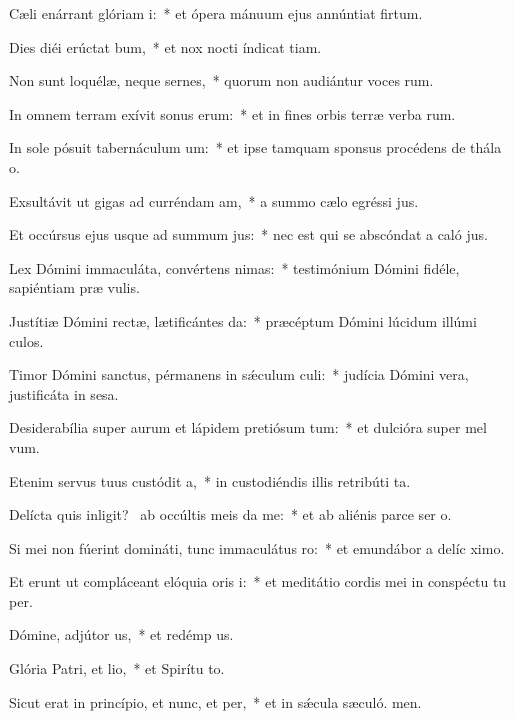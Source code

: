 \item Cæli enárrant glóriam i:~* et ópera mánuum ejus annúntiat firtum.
\item Dies diéi erúctat bum,~* et nox nocti índicat tiam.
\item Non sunt loquélæ, neque sernes,~* quorum non audiántur voces rum.
\item In omnem terram exívit sonus erum:~* et in fines orbis terræ verba rum.
\item In sole pósuit tabernáculum um:~* et ipse tamquam sponsus procédens de thála o.
\item Exsultávit ut gigas ad curréndam am,~* a summo cælo egréssi jus.
\item Et occúrsus ejus usque ad summum jus:~* nec est qui se abscóndat a caló jus.
\item Lex Dómini immaculáta, convértens nimas:~* testimónium Dómini fidéle, sapiéntiam præ vulis.
\item Justítiæ Dómini rectæ, lætificántes da:~* præcéptum Dómini lúcidum illúmi culos.
\item Timor Dómini sanctus, pérmanens in sǽculum culi:~* judícia Dómini vera, justificáta in sesa.
\item Desiderabília super aurum et lápidem pretiósum tum:~* et dulcióra super mel  vum.
\item Etenim servus tuus custódit a,~* in custodiéndis illis retribúti ta.
\item Delícta quis inligit?~\pscross{} ab occúltis meis da me:~* et ab aliénis parce ser o.
\item Si mei non fúerint domináti, tunc immaculátus ro:~* et emundábor a delíc ximo.
\item Et erunt ut compláceant elóquia oris i:~* et meditátio cordis mei in conspéctu tu per.
\item Dómine, adjútor us,~* et redémp us.
\item Glória Patri, et lio,~* et Spirítu to.
\item Sicut erat in princípio, et nunc, et per,~* et in sǽcula sæculó. men.
